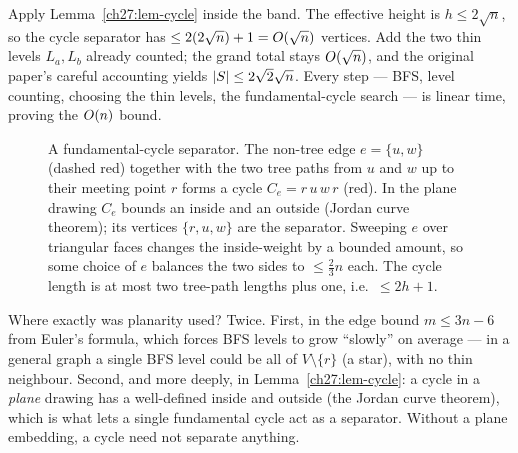 Apply Lemma~\ref{ch27:lem-cycle} inside the band. The effective height is $h\le 2\sqrt n$, so the cycle separator has $\le 2(2\sqrt n)+1=O(\sqrt n)$ vertices. Add the two thin levels $L_a,L_b$ already counted; the grand total stays $O(\sqrt n)$, and the original paper's careful accounting yields $\lvert S\rvert\le 2\sqrt 2\sqrt n$. Every step --- BFS, level counting, choosing the thin levels, the fundamental-cycle search --- is linear time, proving the $O(n)$ bound.

\begin{figure}[H]
\centering
{}
\caption{A fundamental-cycle separator. The non-tree edge $e=\{u,w\}$ (dashed red) together with the two tree paths from $u$ and $w$ up to their meeting point $r$ forms a cycle $C_e=r\,u\,w\,r$ (red). In the plane drawing $C_e$ bounds an inside and an outside (Jordan curve theorem); its vertices $\{r,u,w\}$ are the separator. Sweeping $e$ over triangular faces changes the inside-weight by a bounded amount, so some choice of $e$ balances the two sides to $\le\tfrac23 n$ each. The cycle length is at most two tree-path lengths plus one, i.e.\ $\le 2h+1$.}
\label{ch27:fig-cycle}
\end{figure}

\begin{whybox}
Where exactly was planarity used? Twice. First, in the edge bound $m\le 3n-6$ from Euler's formula, which forces BFS levels to grow ``slowly'' on average --- in a general graph a single BFS level could be all of $V\setminus\{r\}$ (a star), with no thin neighbour. Second, and more deeply, in Lemma~\ref{ch27:lem-cycle}: a cycle in a \emph{plane} drawing has a well-defined inside and outside (the Jordan curve theorem), which is what lets a single fundamental cycle act as a separator. Without a plane embedding, a cycle need not separate anything.
\end{whybox}

